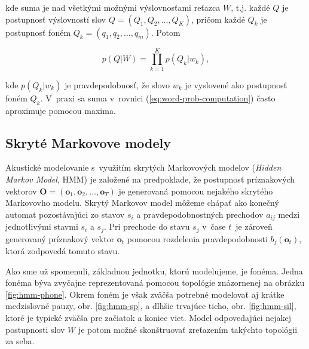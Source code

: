 \noindent kde suma je nad všetkými možnými výslovnosťami reťazca $W$, t.j. každé $Q$ je postupnosť výslovností slov $Q = ( Q_1, Q_2, \dots, Q_K )$, pričom každé $Q_k$ je postupnosť foném $Q_k = ( q_1, q_2, \dots, q_m )$. Potom

\begin{equation}
    p(Q|W) = \prod_{k=1}^K p(Q_k|w_k),
\end{equation}

\noindent kde $p(Q_k|w_k)$ je pravdepodobnosť, že slovo $w_k$ je vyslovené ako postupnosť foném $Q_k$. V~praxi sa suma v~rovnici (\ref{eq:word-prob-computation}) často aproximuje pomocou maxima. 

\subsection*{Skryté Markovove modely}

Akustické modelovanie s~využitím skrytých Markovových modelov (\textit{Hidden Markov Model}, HMM) je založené na predpoklade, že postupnosť príznakových vektorov $\bm{O} = ( \bm{o}_1, \bm{o}_2, \dots, \bm{o}_T )$ je generovaná pomocou nejakého skrytého Markovovho modelu. Skrytý Markovov model môžeme chápať ako konečný automat pozostávajúci zo stavov $s_i$ a pravdepodobnostných prechodov $a_{ij}$ medzi jednotlivými stavmi $s_i$ a $s_j$. Pri prechode do stavu $s_j$ v~čase $t$ je zároveň generovaný príznakový vektor $\bm{o}_t$ pomocou rozdelenia pravdepodobnosti $b_j(\bm{o}_t)$, ktorá zodpovedá tomuto stavu. 

Ako sme už spomenuli, základnou jednotku, ktorú modelujeme, je fonéma. Jedna fonéma býva zvyčajne reprezentovaná pomocou topológie znázornenej na obrázku \ref{fig:hmm-phone}. Okrem foném je však zväčša potrebné modelovať aj krátke medzislovné pauzy, obr. \ref{fig:hmm-sp}, a dlhšie trvajúce ticho, obr. \ref{fig:hmm-sil}, ktoré je typické zväčša pre začiatok a koniec viet. Model odpovedajúci nejakej postupnosti slov $W$ je potom možné skonštruovať zreťazením takýchto topológii za seba.

